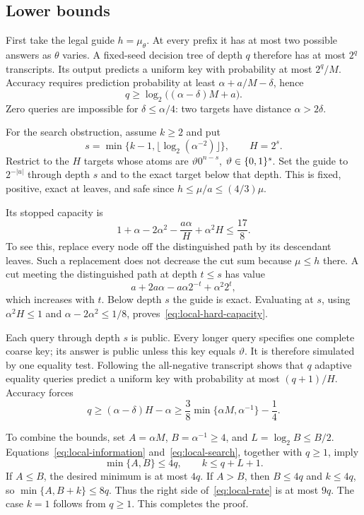 \subsection{Lower bounds}
First take the legal guide $h=\mu_\theta$. At every prefix it has at most two possible answers as $\theta$ varies. A fixed-seed decision tree of depth $q$ therefore has at most $2^q$ transcripts. Its output predicts a uniform key with probability at most $2^q/M$. Accuracy requires prediction probability at least $\alpha+a/M-\delta$, hence
\begin{equation}\label{eq:local-information}
 q\ge\log_2\bigl((\alpha-\delta)M+a\bigr).
\end{equation}
Zero queries are impossible for $\delta\le\alpha/4$: two targets have distance $\alpha>2\delta$.

For the search obstruction, assume $k\ge2$ and put
\[
 s=\min\{k-1,\lfloor\log_2(\alpha^{-2})\rfloor\},\qquad H=2^s.
\]
Restrict to the $H$ targets whose atoms are $\vartheta0^{n-s}$, $\vartheta\in\{0,1\}^s$. Set the guide to $2^{-|u|}$ through depth $s$ and to the exact target below that depth. This is fixed, positive, exact at leaves, and safe since $h\le\mu/a\le(4/3)\mu$.

Its stopped capacity is
\begin{equation}\label{eq:local-hard-capacity}
 1+\alpha-2\alpha^2-\frac{a\alpha}{H}+\alpha^2H\le\frac{17}{8}.
\end{equation}
To see this, replace every node off the distinguished path by its descendant leaves. Such a replacement does not decrease the cut sum because $\mu\le h$ there. A cut meeting the distinguished path at depth $t\le s$ has value
\[
 a+2a\alpha-a\alpha 2^{-t}+\alpha^2 2^t,
\]
which increases with $t$. Below depth $s$ the guide is exact. Evaluating at $s$, using $\alpha^2H\le1$ and $\alpha-2\alpha^2\le1/8$, proves~\eqref{eq:local-hard-capacity}.

Each query through depth $s$ is public. Every longer query specifies one complete coarse key; its answer is public unless this key equals $\vartheta$. It is therefore simulated by one equality test. Following the all-negative transcript shows that $q$ adaptive equality queries predict a uniform key with probability at most $(q+1)/H$. Accuracy forces
\begin{equation}\label{eq:local-search}
 q\ge (\alpha-\delta)H-\alpha
 \ge\frac38\min\{\alpha M,\alpha^{-1}\}-\frac14.
\end{equation}

To combine the bounds, set $A=\alpha M$, $B=\alpha^{-1}\ge4$, and $L=\log_2 B\le B/2$. Equations~\eqref{eq:local-information} and~\eqref{eq:local-search}, together with $q\ge1$, imply
\[
 \min\{A,B\}\le4q,\qquad k\le q+L+1.
\]
If $A\le B$, the desired minimum is at most $4q$. If $A>B$, then $B\le4q$ and $k\le4q$, so $\min\{A,B+k\}\le8q$. Thus the right side of~\eqref{eq:local-rate} is at most $9q$. The case $k=1$ follows from $q\ge1$. This completes the proof.

